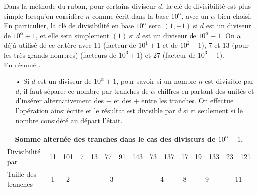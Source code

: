 \documentclass[a4paper, twoside]{article}
\begin{document}
		Dans la méthode du ruban, pour certains diviseur $d$, la clé de divisibilité est plus simple lorsqu'on considère $n$ comme écrit dans la base $10^\alpha$, avec un $\alpha$ bien choisi.\\

		En particulier, la clé de divisibilité en base $10^\alpha$ sera $(1, -1)$ si $d$ est un diviseur de $10^\alpha + 1$, et elle sera simplement $(1)$ si $d$ est un diviseur de $10^\alpha - 1$. On a déjà utilisé de ce critère avec 11 (facteur de $10^1 + 1$ et de $10^2 - 1$), 7 et 13 (pour les très grands nombres) (facteurs de $10^3 + 1$) et 27 (facteur de $10^3 - 1$).\\

	{ \parindent=0.5cm En résumé : }

	\begin{itemize}

		\item[•] Si $d$ est un diviseur de $10^\alpha + 1$, pour savoir si un nombre $n$ est divisible par $d$, il faut séparer ce nombre par tranches de $\alpha$ chiffres en partant des unités et d'insérer alternativement des $-$ et des $+$ entre les tranches. On effectue l'opération ainsi écrite et le résultat est divisible par $d$ si et seulement si le nombre considéré au départ l'était.
		
		\vspace{0.2cm}

	\end{itemize}
		
		{ \noindent
		\begin{tabular}{|l|c|c|c|c|c|c|c|c|c|c|c|c|c|c|}
			\multicolumn{15}{c}{{\small \textbf{Somme alternée des tranches dans le cas des diviseurs de {\boldmath $10^\alpha + 1$}.}}} \\
			\hline 
			Divisibilité par & \footnotesize 11 & \footnotesize 101 & \footnotesize 7 & \footnotesize 13 & \footnotesize 77 & \footnotesize 91 & \footnotesize 143 & \footnotesize 73 & \footnotesize 137 & \footnotesize 17 & \footnotesize 19 & \footnotesize 133 & \footnotesize 23 & \footnotesize 121 \\ 
			\hline 
			Taille des tranches & 1 & 2 & \multicolumn{5}{c|}{3} & \multicolumn{2}{c|}{4} & 8 & \multicolumn{2}{c|}{9} & \multicolumn{2}{c|}{11} \\ 
	\hline 
	\end{tabular} }


	\vspace{1cm}
\end{document}
